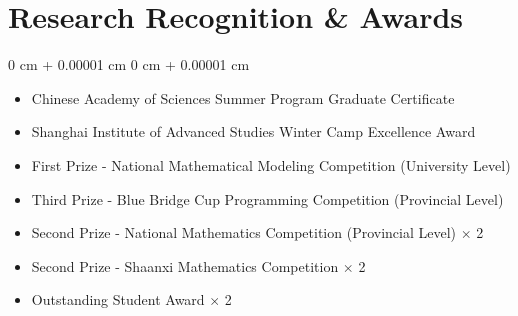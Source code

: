 \documentclass[10pt, a4paper]{article}
\newenvironment{highlights}{
    \begin{itemize}[
        topsep=0.15 cm,
        parsep=0.08 cm,
        partopsep=0pt,
        itemsep=0.05 cm,
        leftmargin=0 cm + 10pt
    ]
}{
    \end{itemize}
} %
\newenvironment{onecolentry}{
    \begin{adjustwidth}{
        0 cm + 0.00001 cm
    }{
        0 cm + 0.00001 cm
    }
}{
    \end{adjustwidth}
} %
\begin{document}
    \section{Research Recognition \& Awards}

        \begin{onecolentry}
            \begin{highlights}
                \item Chinese Academy of Sciences Summer Program Graduate Certificate
                \item Shanghai Institute of Advanced Studies Winter Camp Excellence Award
                \item First Prize - National Mathematical Modeling Competition (University Level)
                \item Third Prize - Blue Bridge Cup Programming Competition (Provincial Level)
                \item Second Prize - National Mathematics Competition (Provincial Level) $\times$ 2
                \item Second Prize - Shaanxi Mathematics Competition $\times$ 2
                \item Outstanding Student Award $\times$ 2
            \end{highlights}
        \end{onecolentry}


    
\end{document}
